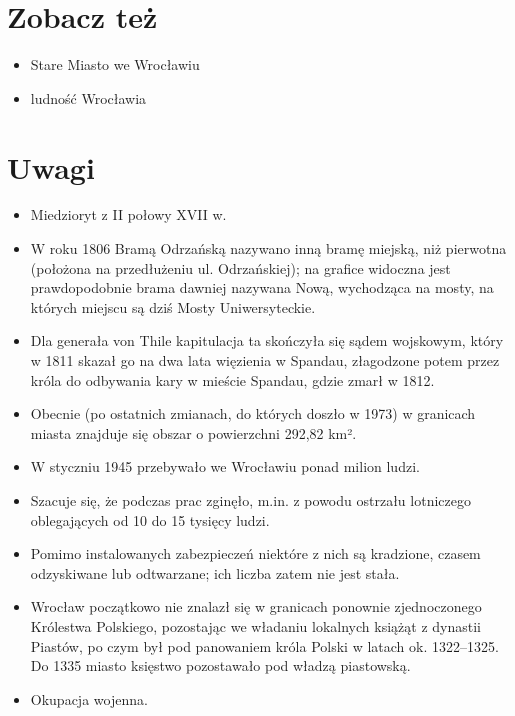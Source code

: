 \documentclass{article}
\begin{document}
\section{Zobacz też}
\begin{itemize}
    \item Stare Miasto we Wrocławiu
    \item ludność Wrocławia
\end{itemize}
\section{Uwagi}
\begin{itemize}
    \item Miedzioryt z II połowy XVII w.
    \item W roku 1806 Bramą Odrzańską nazywano inną bramę miejską, niż pierwotna (położona na przedłużeniu ul. Odrzańskiej); na grafice widoczna jest prawdopodobnie brama dawniej nazywana Nową, wychodząca na mosty, na których miejscu są dziś Mosty Uniwersyteckie.
    \item Dla generała von Thile kapitulacja ta skończyła się sądem wojskowym, który w 1811 skazał go na dwa lata więzienia w Spandau, złagodzone potem przez króla do odbywania kary w mieście Spandau, gdzie zmarł w 1812.
    \item Obecnie (po ostatnich zmianach, do których doszło w 1973) w granicach miasta znajduje się obszar o powierzchni 292,82 km².
    \item W styczniu 1945 przebywało we Wrocławiu ponad milion ludzi.
    \item Szacuje się, że podczas prac zginęło, m.in. z powodu ostrzału lotniczego oblegających od 10 do 15 tysięcy ludzi.
    \item Pomimo instalowanych zabezpieczeń niektóre z nich są kradzione, czasem odzyskiwane lub odtwarzane; ich liczba zatem nie jest stała.
    \item  Wrocław początkowo nie znalazł się w granicach ponownie zjednoczonego Królestwa Polskiego, pozostając we władaniu lokalnych książąt z dynastii Piastów, po czym był pod panowaniem króla Polski w latach ok. 1322–1325. Do 1335 miasto księstwo pozostawało pod władzą piastowską.
    \item  Okupacja wojenna.
\end{itemize}
\end{document}
